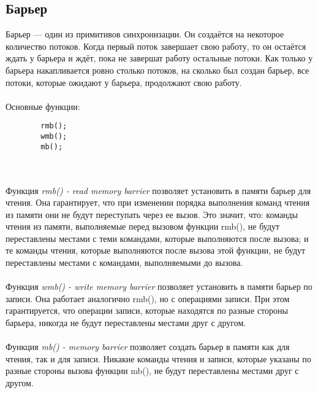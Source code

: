 \subsection{Барьер}
    Барьер — один из примитивов синхронизации. Он создаётся на некоторое количество потоков. Когда первый поток завершает свою работу, то он остаётся ждать у барьера и ждёт, пока не завершат работу остальные потоки. Как только у барьера накапливается ровно столько потоков, на сколько был создан барьер, все потоки, которые ожидают у барьера, продолжают свою работу.
    \\\\
    Основные функции:
    \begin{lstlisting}
        rmb();
        wmb();
        mb();
    \end{lstlisting}
    \\\\
    Функция \textit{rmb() - read memory barrier} позволяет установить в памяти барьер для чтения. Она гарантирует, что при изменении порядка выполнения команд чтения из памяти они не будут переступать через ее вызов. Это значит, что: команды чтения из памяти, выполняемые перед вызовом функции rmb(), не будут переставлены местами с теми командами, которые выполняются после вызова; и те команды чтения, которые выполняются после вызова этой функции, не будут переставлены местами с командами, выполняемыми до вызова.
    \\\\
    Функция \textit{wmb() - write memory barrier} позволяет установить в памяти барьер по записи. Она работает аналогично rmb(), но с операциями записи. При этом гарантируется, что операции записи, которые находятся по разные стороны барьера, никогда не будут переставлены местами друг с другом.
    \\\\
    Функция \textit{mb() - memory barrier} позволяет создать барьер в памяти как для чтения, так и для записи. Никакие команды чтения и записи, которые указаны по разные стороны вызова функции mb(), не будут переставлены местами друг с другом. 

